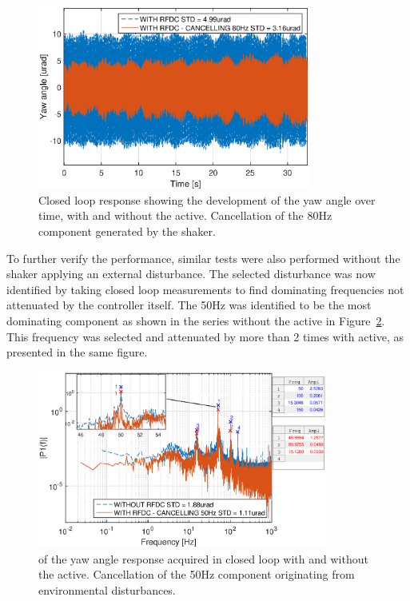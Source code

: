 \begin{figure}[h]
  \centering %
  \includegraphics[width=0.8\textwidth]{fig/matlab/yl_closedloop_ext_disturbance_80Hz_2}
  \caption{\label{fig:yl_closedloop_80} Closed loop response showing the development of the yaw angle over time, with and without the \abbrRFDC active. Cancellation of the 80Hz component generated by the shaker.}
\end{figure}

To further verify the performance, similar tests were also performed without the shaker applying an external disturbance. The selected disturbance was now identified by taking closed loop measurements to find dominating frequencies not attenuated by the controller itself. The 50Hz was identified to be the most dominating component as shown in the series without the \abbrRFDC active in Figure~\ref{fig:fft_closedloop_50}. This frequency was selected and attenuated by more than 2 times with \abbrRFDC active, as presented in the same figure.

\begin{figure}[h]
  \centering %
  \includegraphics[width=0.85\textwidth]{fig/matlab/fft_closedloop_50Hz}
  \caption{\label{fig:fft_closedloop_50}\abbrFFT of the yaw angle response acquired in closed loop with and without the \abbrRFDC active. Cancellation of the 50Hz component originating from environmental disturbances.}
\end{figure}

